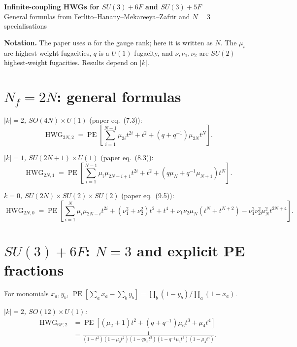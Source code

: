 \documentclass[9pt]{article}
\newcommand{\PE}{\operatorname{PE}}
\newcommand{\HWG}{\operatorname{HWG}}
\begin{document}
\small

\begin{center}
    {\large\bfseries Infinite-coupling HWGs for $SU(3)+6F$ and $SU(3)+5F$}\\[-1mm]
    {\footnotesize General formulas from Ferlito--Hanany--Mekareeya--Zafrir and $N=3$ specialisations}
\end{center}

\textbf{Notation.}
The paper uses $n$ for the gauge rank; here it is written as $N$.
The $\mu_i$ are highest-weight fugacities, $q$ is a $U(1)$ fugacity, and
$\nu,\nu_1,\nu_2$ are $SU(2)$ highest-weight fugacities. Results depend on $|k|$.

\section*{$N_f=2N$: general formulas}

\emph{$|k|=2$, $SO(4N)\times U(1)$} (paper eq.~(7.3)):
\begin{equation}
\HWG_{2N,2}=\PE\!\left[
\sum_{i=1}^{N-1}\mu_{2i}t^{2i}+t^2+
\left(q+q^{-1}\right)\mu_{2N}t^N
\right].
\end{equation}

\emph{$|k|=1$, $SU(2N+1)\times U(1)$} (paper eq.~(8.3)):
\begin{equation}
\HWG_{2N,1}=\PE\!\left[
\sum_{i=1}^{N-1}\mu_i\mu_{2N-i+1}t^{2i}+t^2+
\left(q\mu_N+q^{-1}\mu_{N+1}\right)t^N
\right].
\end{equation}

\emph{$k=0$, $SU(2N)\times SU(2)\times SU(2)$} (paper eq.~(9.5)):
\begin{equation}
\HWG_{2N,0}=\PE\!\left[
\sum_{i=1}^{N}\mu_i\mu_{2N-i}t^{2i}
+(\nu_1^2+\nu_2^2)t^2+t^4
+\nu_1\nu_2\mu_N\left(t^N+t^{N+2}\right)
-\nu_1^2\nu_2^2\mu_N^2t^{2N+4}
\right].
\end{equation}

\section*{$SU(3)+6F$: $N=3$ and explicit PE fractions}
For monomials $x_a,y_b$,
$\PE[\sum_a x_a-\sum_b y_b]=\prod_b(1-y_b)/\prod_a(1-x_a)$.

\emph{$|k|=2$, $SO(12)\times U(1)$:}
\begin{align}
\HWG_{6F,2}
&=\PE\!\left[(\mu_2+1)t^2+(q+q^{-1})\mu_6t^3+\mu_4t^4\right]\\
&=\frac{1}{(1-t^2)(1-\mu_2t^2)(1-q\mu_6t^3)(1-q^{-1}\mu_6t^3)(1-\mu_4t^4)}.
\end{align}
\end{document}
